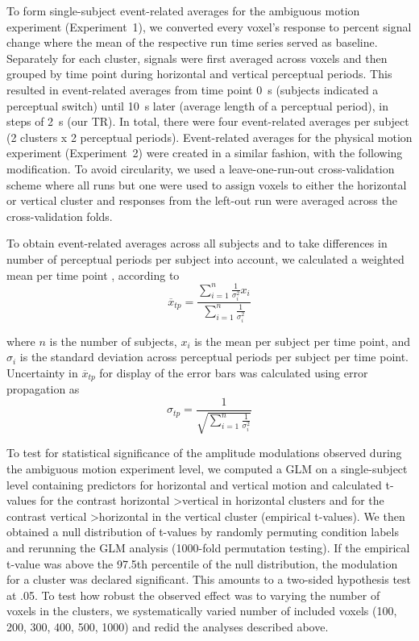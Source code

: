 To form single-subject event-related averages for the ambiguous motion experiment (Experiment~1), we converted every voxel's response to percent signal change where the mean of the respective run time series served as baseline. Separately for each cluster, signals were first averaged across voxels and then grouped by time point during horizontal and vertical perceptual periods. This resulted in event-related averages from time point 0~s (subjects indicated a perceptual switch) until 10~s later (average length of a perceptual period), in steps of 2~s (our TR). In total, there were four event-related averages per subject (2 clusters x 2 perceptual periods). Event-related averages for the physical motion experiment (Experiment~2) were created in a similar fashion, with the following modification. To avoid circularity, we used a leave-one-run-out cross-validation scheme where all runs but one were used to assign voxels to either the horizontal or vertical cluster and responses from the left-out run were averaged across the cross-validation folds.

To obtain event-related averages across all subjects and to take differences in number of perceptual periods per subject into account, we calculated a weighted mean per time point \parencite{Cohen1998}, according to 
\begin{equation}
\overline{x}_{tp} = \frac{\sum\limits_{i=1}^n \frac{1}{\sigma_i^2} x_i}{\sum\limits_{i=1}^n \frac{1}{\sigma_i^2}}
\end{equation}

where $n$ is the number of subjects, $x_i$ is the mean per subject per time point, and $\sigma_i$ is the standard deviation across perceptual periods per subject per time point. Uncertainty in $\overline{x}_{tp}$ for display of the error bars was calculated using error propagation \parencite{Cohen1998} as
\begin{equation}
\sigma_{tp} = \frac{1}{\sqrt{\sum\limits_{i=1}^n \frac{1}{\sigma_i^2}}}
\end{equation}

To test for statistical significance of the amplitude modulations observed during the ambiguous motion experiment level, we computed a GLM on a single-subject level containing predictors for horizontal and vertical motion and calculated t-values for the contrast horizontal \textgreater vertical in horizontal clusters and for the contrast vertical \textgreater horizontal in the vertical cluster (empirical t-values). We then obtained a null distribution of t-values by randomly permuting condition labels and rerunning the GLM analysis (1000-fold permutation testing). If the empirical t-value was above the 97.5th percentile of the null distribution, the modulation for a cluster was declared significant. This amounts to a two-sided hypothesis test at .05. To test how robust the observed effect was to varying the number of voxels in the clusters, we systematically varied number of included voxels (100, 200, 300, 400, 500, 1000) and redid the analyses described above.

